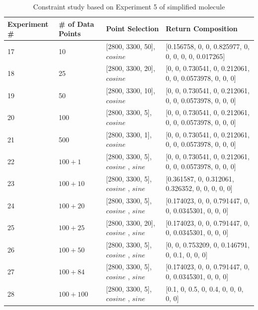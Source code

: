 \begin{table} \tiny 
\begin{center}
\begin{tabular}{| p{2cm} | p{2cm} | p{4cm}  | l |}
\hline
Experiment \# & \# of Data Points & Point Selection & Return Composition \\ \hline
17 & 10 & [2800, 3300, 50], $cosine$ & [0.156758, 0, 0, 0.825977, 0, 0, 0, 0, 0, 0.017265] \\ \hline
18 & 25 & [2800, 3300, 20], $cosine$ & [0, 0, 0.730541, 0, 0.212061, 0, 0, 0.0573978, 0, 0, 0] \\ \hline
19 & 50 & [2800, 3300, 10], $cosine$ & [0, 0, 0.730541, 0, 0.212061, 0, 0, 0.0573978, 0, 0, 0] \\ \hline
20 & 100 & [2800, 3300, 5], $cosine$ & [0, 0, 0.730541, 0, 0.212061, 0, 0, 0.0573978, 0, 0, 0] \\ \hline
21 & 500 & [2800, 3300, 1], $cosine$ & [0, 0, 0.730541, 0, 0.212061, 0, 0, 0.0573978, 0, 0, 0] \\ \hline	
22 & $100 + 1$ & [2800, 3300, 5], $cosine$ \newline [2800, 3300, 500], $sine$  & [0, 0, 0.730541, 0, 0.212061, 0, 0, 0.0573978, 0, 0, 0] \\ \hline
23 & $100 + 10$ & [2800, 3300, 5], $cosine$ \newline [2800, 3300, 50], $sine$  & [0.361587, 0, 0.312061, 0.326352, 0, 0, 0, 0, 0] \\ \hline
24 & $100 + 20$ & [2800, 3300, 5], $cosine$ \newline [2800, 3300, 25], $sine$  & [0.174023, 0, 0, 0.791447, 0, 0, 0.0345301, 0, 0, 0] \\ \hline
25 & $100 + 25$ & [2800, 3300, 20], $cosine$ \newline [2800, 3300, 20], $sine$  & [0.174023, 0, 0, 0.791447, 0, 0, 0.0345301, 0, 0, 0] \\ \hline
26 & $100 + 50$ & [2800, 3300, 5], $cosine$ \newline [2800, 3300, 10], $sine$  & [0, 0, 0.753209, 0, 0.146791, 0, 0.1, 0, 0, 0] \\ \hline
27 & $100 + 84$ & [2800, 3300, 5], $cosine$ \newline [2800, 3300, 6], $sine$  & [0.174023, 0, 0, 0.791447, 0, 0, 0.0345301, 0, 0, 0] \\ \hline
28 & $100 + 100$ & [2800, 3300, 5], $cosine$ \newline [2800, 3300, 5], $sine$  & [0.1, 0, 0.5, 0, 0.4, 0, 0, 0, 0, 0] \\ 
\hline
\end{tabular} \\
\caption{Constraint study based on Experiment 5 of simplified molecule}\label{tab:3.5}
\end{center}
\end{table}

